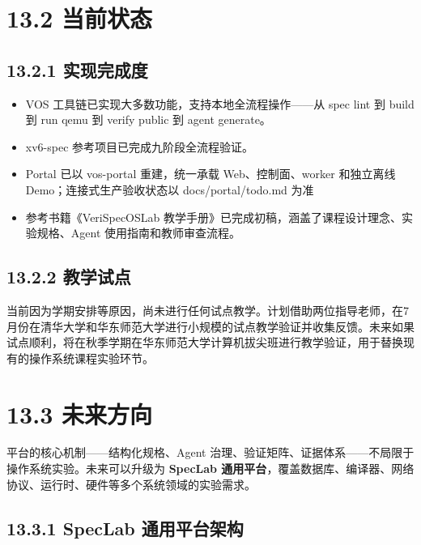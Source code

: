 \documentclass[UTF8,a4paper,12pt,openany]{ctexrep}
\providecommand{\tightlist}{\setlength{\itemsep}{0pt}\setlength{\parskip}{0pt}}
\begin{document}
\section{13.2 当前状态}\label{132-ux5f53ux524dux72b6ux6001}

\subsection{13.2.1 实现完成度}\label{1321-ux5b9eux73b0ux5b8cux6210ux5ea6}

\begin{itemize}
\tightlist
\item
  VOS 工具链已实现大多数功能，支持本地全流程操作------从 spec lint 到 build 到 run qemu 到 verify public 到 agent generate。
\item
  xv6-spec 参考项目已完成九阶段全流程验证。
\item
  Portal 已以 vos-portal 重建，统一承载 Web、控制面、worker 和独立离线 Demo；连接式生产验收状态以 docs/portal/todo.md 为准
\item
  参考书籍《VeriSpecOSLab 教学手册》已完成初稿，涵盖了课程设计理念、实验规格、Agent 使用指南和教师审查流程。
\end{itemize}

\subsection{13.2.2 教学试点}\label{1322-ux6559ux5b66ux8bd5ux70b9}

当前因为学期安排等原因，尚未进行任何试点教学。计划借助两位指导老师，在7月份在清华大学和华东师范大学进行小规模的试点教学验证并收集反馈。未来如果试点顺利，将在秋季学期在华东师范大学计算机拔尖班进行教学验证，用于替换现有的操作系统课程实验环节。

\section{13.3 未来方向}\label{133-ux672aux6765ux65b9ux5411}

平台的核心机制------结构化规格、Agent 治理、验证矩阵、证据体系------不局限于操作系统实验。未来可以升级为 \textbf{SpecLab 通用平台}，覆盖数据库、编译器、网络协议、运行时、硬件等多个系统领域的实验需求。

\subsection{13.3.1 SpecLab 通用平台架构}\label{1331-speclab-ux901aux7528ux5e73ux53f0ux67b6ux6784}
\end{document}
